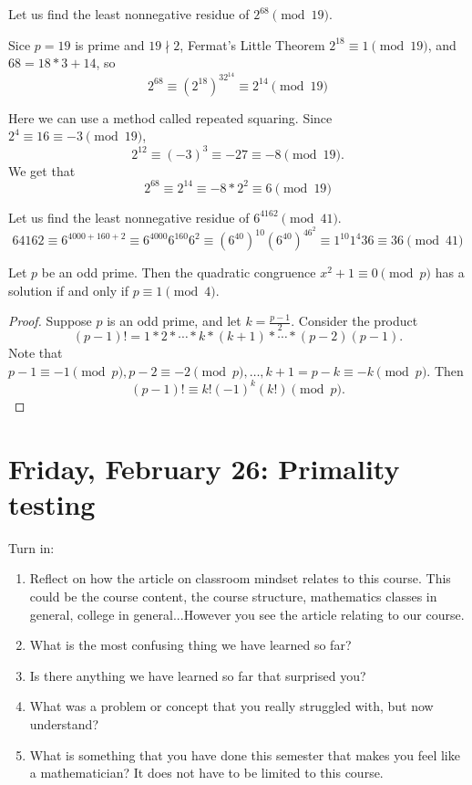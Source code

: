\documentclass[letterpaper, 11 pt]{article}
\begin{document}
\begin{example}[Example 4.1]
 Let us find the least nonnegative residue of $2^{68} \pmod{19}$.
 
 Sice $p=19$ is prime and $19\nmid 2$, Fermat's Little Theorem $2^{18}\equiv 1\pmod{19}$, and $68=18*3+14$, so
 \[2^{68}\equiv (2^{18})^32^{14}\equiv 2^{14} \pmod {19}\]
 
 Here we can use a method called repeated squaring. Since $2^4\equiv 16\equiv -3 \pmod{19}$, \[2^{12}\equiv (-3)^3\equiv -27\equiv -8\pmod{19}.\]
 We get that  \[2^{68}\equiv 2^{14} \equiv -8*2^2\equiv 6\pmod {19}\]

\end{example}
 
\begin{br}[5 minutes]
 Let us find the least nonnegative residue of $6^{4162}  \pmod{41}$.
\[64162 \equiv 6^{4000+160+2} \equiv 6^{4000}6^{160}6^2 \equiv (6^{40})^{10}(6^{40})^46^2 \equiv 1^{10}1^4 36 \equiv 36 \pmod{41}\]
\end{br}

\begin{thm}[Theorem 4.6]
 Let $p$ be an odd prime. Then the quadratic congruence $x^2+1\equiv 0 \pmod p$ has a solution if and only if $p\equiv 1 \pmod 4$.
\end{thm}
\begin{proof}
 Suppose $p$ is an odd prime, and let $k=\frac{p-1}{2}$. Consider the product \[(p-1)!=1*2*\cdots*k*(k+1)*\cdots*(p-2)(p-1).\]
Note that $p-1\equiv -1\pmod p,p-2\equiv -2\pmod p, \dots, k+1=p-k\equiv -k\pmod p$. Then \[(p-1)!\equiv k! (-1)^k(k!)\pmod p.\]
\end{proof}

\section{Friday, February 26: Primality testing}
Turn in:
\begin{enumerate}
 \item Reflect on how the article on classroom mindset relates to this course. This could be the course content, the course structure, mathematics classes in general, college in general...However you see the article relating to our course.

\item What is the most confusing thing we have learned so far?

\item Is there anything we have learned so far that surprised you?
\item What was a problem or concept that you really struggled with, but now understand? 
\item What is something that you have done this semester that makes you feel like a mathematician? It does not have to be limited to this course.

\end{enumerate}
\end{document}
